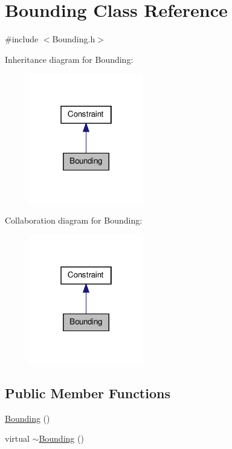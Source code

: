 \hypertarget{classBounding}{\section{\-Bounding \-Class \-Reference}
\label{classBounding}
}


{\ttfamily \#include $<$\-Bounding.\-h$>$}



\-Inheritance diagram for \-Bounding\-:\nopagebreak
\begin{figure}[H]
\begin{center}
\leavevmode
\includegraphics[width=142pt]{classBounding__inherit__graph}
\end{center}
\end{figure}


\-Collaboration diagram for \-Bounding\-:\nopagebreak
\begin{figure}[H]
\begin{center}
\leavevmode
\includegraphics[width=142pt]{classBounding__coll__graph}
\end{center}
\end{figure}
\subsection*{\-Public \-Member \-Functions}
\begin{DoxyCompactItemize}
\item 
\hyperlink{classBounding_ab8478542374a91a79e47ef8bea4c3fca}{\-Bounding} ()
\item 
virtual \hyperlink{classBounding_a8e3b81ea2078454840fe93a44f634d56}{$\sim$\-Bounding} ()
\end{DoxyCompactItemize}
